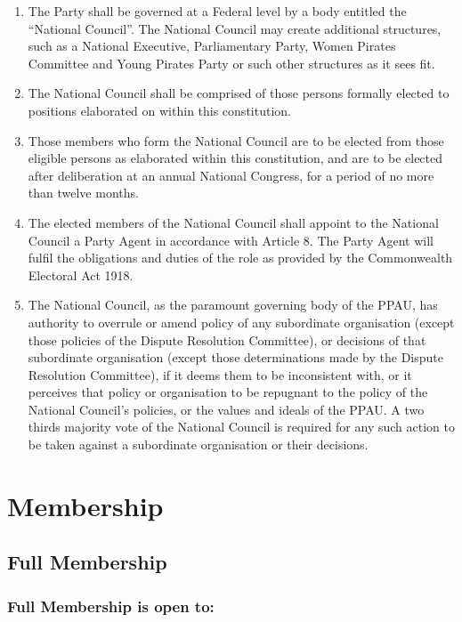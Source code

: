 \documentclass[a4paper,titlepage,8.5pt]{article}
\begin{document}
\begin{enumerate}
\item The Party shall be governed at a Federal level by a body entitled the ``National Council''. The National Council may create additional structures, such as a National Executive, Parliamentary Party, Women Pirates Committee and Young Pirates Party or such other structures as it sees fit.
\item The National Council shall be comprised of those persons formally elected to positions elaborated on within this constitution.
\item Those members who form the National Council are to be elected from those eligible persons as elaborated within this constitution, and are to be elected after deliberation at an annual National Congress, for a period of no more than twelve months.
\item The elected members of the National Council shall appoint to the National Council a Party Agent in accordance with Article 8. The Party Agent will fulfil the obligations and duties of the role as provided by the Commonwealth Electoral Act 1918.
\item The National Council, as the paramount governing body of the PPAU, has authority to overrule or amend policy of any subordinate organisation (except those policies of the Dispute Resolution Committee), or decisions of that subordinate organisation (except those determinations made by the Dispute Resolution Committee), if it deems them to be inconsistent with, or it perceives that policy or organisation to be repugnant to the policy of the National Council’s policies, or the values and ideals of the PPAU. A two thirds majority vote of the National Council is required for any such action to be taken against a subordinate organisation or their decisions.
\end{enumerate}

\section{Membership}

\subsection{Full Membership}

\subsubsection{Full Membership is open to:}
\end{document}
